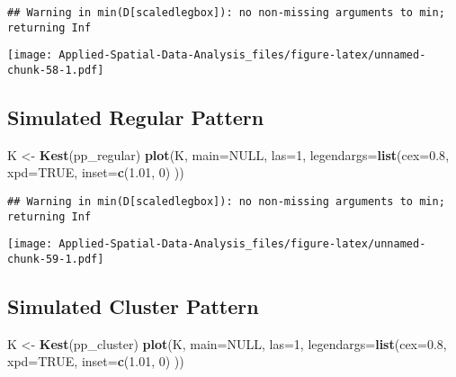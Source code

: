\documentclass[
]{book}
\newenvironment{Shaded}{\begin{snugshade}}{\end{snugshade}}
\newcommand{\DataTypeTok}[1]{\textcolor[rgb]{0.13,0.29,0.53}{#1}}
\newcommand{\DecValTok}[1]{\textcolor[rgb]{0.00,0.00,0.81}{#1}}
\newcommand{\FloatTok}[1]{\textcolor[rgb]{0.00,0.00,0.81}{#1}}
\newcommand{\KeywordTok}[1]{\textcolor[rgb]{0.13,0.29,0.53}{\textbf{#1}}}
\newcommand{\NormalTok}[1]{#1}
\newcommand{\OtherTok}[1]{\textcolor[rgb]{0.56,0.35,0.01}{#1}}
\newcommand{\StringTok}[1]{\textcolor[rgb]{0.31,0.60,0.02}{#1}}
\begin{document}
\begin{verbatim}
## Warning in min(D[scaledlegbox]): no non-missing arguments to min; returning Inf
\end{verbatim}

\texttt{[image: Applied-Spatial-Data-Analysis\_files/figure-latex/unnamed-chunk-58-1.pdf]}

\hypertarget{simulated-regular-pattern-4}{%
\subsection{Simulated Regular Pattern}\label{simulated-regular-pattern-4}}

\begin{Shaded}
\begin{Highlighting}[]
\NormalTok{K <-}\StringTok{ }\KeywordTok{Kest}\NormalTok{(pp_regular)}
\KeywordTok{plot}\NormalTok{(K, }\DataTypeTok{main=}\OtherTok{NULL}\NormalTok{, }\DataTypeTok{las=}\DecValTok{1}\NormalTok{, }\DataTypeTok{legendargs=}\KeywordTok{list}\NormalTok{(}\DataTypeTok{cex=}\FloatTok{0.8}\NormalTok{, }\DataTypeTok{xpd=}\OtherTok{TRUE}\NormalTok{, }\DataTypeTok{inset=}\KeywordTok{c}\NormalTok{(}\FloatTok{1.01}\NormalTok{, }\DecValTok{0}\NormalTok{) ))}
\end{Highlighting}
\end{Shaded}

\begin{verbatim}
## Warning in min(D[scaledlegbox]): no non-missing arguments to min; returning Inf
\end{verbatim}

\texttt{[image: Applied-Spatial-Data-Analysis\_files/figure-latex/unnamed-chunk-59-1.pdf]}

\hypertarget{simulated-cluster-pattern-4}{%
\subsection{Simulated Cluster Pattern}\label{simulated-cluster-pattern-4}}

\begin{Shaded}
\begin{Highlighting}[]
\NormalTok{K <-}\StringTok{ }\KeywordTok{Kest}\NormalTok{(pp_cluster)}
\KeywordTok{plot}\NormalTok{(K, }\DataTypeTok{main=}\OtherTok{NULL}\NormalTok{, }\DataTypeTok{las=}\DecValTok{1}\NormalTok{, }\DataTypeTok{legendargs=}\KeywordTok{list}\NormalTok{(}\DataTypeTok{cex=}\FloatTok{0.8}\NormalTok{, }\DataTypeTok{xpd=}\OtherTok{TRUE}\NormalTok{, }\DataTypeTok{inset=}\KeywordTok{c}\NormalTok{(}\FloatTok{1.01}\NormalTok{, }\DecValTok{0}\NormalTok{) ))}
\end{Highlighting}
\end{Shaded}
\end{document}
